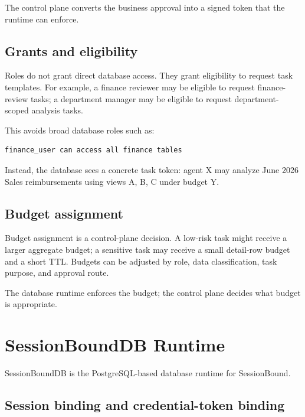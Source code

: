 \documentclass[
]{article}
\begin{document}
The control plane converts the business approval into a signed token
that the runtime can enforce.

\hypertarget{grants-and-eligibility}{%
\subsection{Grants and
eligibility}\label{grants-and-eligibility}}

Roles do not grant direct database access. They grant eligibility to
request task templates. For example, a finance reviewer may be eligible
to request finance-review tasks; a department manager may be eligible to
request department-scoped analysis tasks.

This avoids broad database roles such as:

\begin{verbatim}
finance_user can access all finance tables
\end{verbatim}

Instead, the database sees a concrete task token: agent X may analyze
June 2026 Sales reimbursements using views A, B, C under budget Y.

\hypertarget{budget-assignment}{%
\subsection{Budget assignment}\label{budget-assignment}}

Budget assignment is a control-plane decision. A low-risk task might
receive a larger aggregate budget; a sensitive task may receive a small
detail-row budget and a short TTL. Budgets can be adjusted by role, data
classification, task purpose, and approval route.

The database runtime enforces the budget; the control plane decides what
budget is appropriate.


\hypertarget{sessionbounddb-runtime}{%
\section{SessionBoundDB Runtime}\label{sessionbounddb-runtime}}

SessionBoundDB is the PostgreSQL-based database runtime for
SessionBound.

\hypertarget{session-binding-and-credential-token-binding}{%
\subsection{Session binding and credential-token
binding}\label{session-binding-and-credential-token-binding}}
\end{document}
